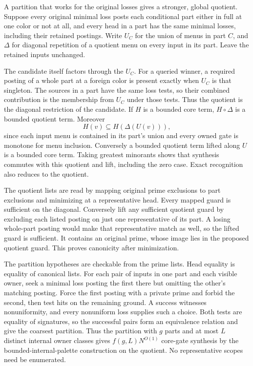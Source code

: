 A partition that works for the original
losses gives a stronger, global quotient.
Suppose every original minimal loss posts
each conditional part either in full at one
color or not at all, and every head in a part
has the same minimal losses, including
their retained postings. Write $U_C$ for
the union of menus in part $C$, and $\Delta$
for diagonal repetition of a quotient
menu on every input in its part. Leave
the retained inputs unchanged.

The candidate itself factors through
the $U_C$. For a queried winner, a required
posting of a whole part at a foreign color
is present exactly when $U_C$ is that
singleton. The sources in a part have
the same loss tests, so their combined
contribution is the membership from $U_C$
under those tests. Thus the quotient is
the diagonal restriction of the candidate.
If $H$ is a bounded core term, $H\circ\Delta$
is a bounded quotient term. Moreover
\[
           H(v)\subseteq H(\Delta(U(v))),
\]
since each input menu is contained in
its part's union and every owned gate is
monotone for menu inclusion. Conversely
a bounded quotient term lifted along $U$
is a bounded core term. Taking greatest
minorants shows that synthesis commutes
with this quotient and lift, including
the zero case. Exact recognition also
reduces to the quotient.

The quotient lists are read by mapping
original prime exclusions to part
exclusions and minimizing at a
representative head. Every mapped guard
is sufficient on the diagonal. Conversely
lift any sufficient quotient guard by
excluding each listed posting on just
one representative of its part.
A losing whole-part posting would make
that representative match as well, so
the lifted guard is sufficient. It
contains an original prime, whose image
lies in the proposed quotient guard.
This proves canonicity after minimization.

The partition hypotheses are checkable
from the prime lists. Head equality is
equality of canonical lists. For each
pair of inputs in one part and each
visible owner, seek a minimal loss
posting the first there but omitting
the other's matching posting. Force
the first posting with a private prime
and forbid the second, then test hits
on the remaining ground. A success
witnesses nonuniformity, and every
nonuniform loss supplies such a choice.
Both tests are equality of signatures,
so the successful pairs form an equivalence
relation and give the coarsest partition.
Thus the partition with $g$
parts and at most $L$ distinct internal
owner classes gives
$f(g,L)N^{O(1)}$ core-gate synthesis
by the bounded-internal-palette
construction on the quotient. No
representative scopes need be enumerated.


